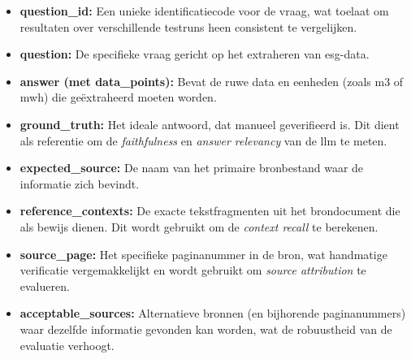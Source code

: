 \begin{itemize}
    \item \textbf{question\_id:} Een unieke identificatiecode voor de vraag, wat toelaat om resultaten over verschillende testruns heen consistent te vergelijken.
    \item \textbf{question:} De specifieke vraag gericht op het extraheren van \gls{esg}-data.
    \item \textbf{answer (met data\_points):} Bevat de ruwe data en eenheden (zoals \gls{m3} of \gls{mwh}) die geëxtraheerd moeten worden.
    \item \textbf{ground\_truth:} Het ideale antwoord, dat manueel geverifieerd is. Dit dient als referentie om de \textit{faithfulness} en \textit{answer relevancy} van de \gls{llm} te meten.
    \item \textbf{expected\_source:} De naam van het primaire bronbestand waar de informatie zich bevindt.
    \item \textbf{reference\_contexts:} De exacte tekstfragmenten uit het brondocument die als bewijs dienen. Dit wordt gebruikt om de \textit{context recall} te berekenen.
    \item \textbf{source\_page:} Het specifieke paginanummer in de bron, wat handmatige verificatie vergemakkelijkt en wordt gebruikt om \textit{source attribution} te evalueren.
    \item \textbf{acceptable\_sources:} Alternatieve bronnen (en bijhorende paginanummers) waar dezelfde informatie gevonden kan worden, wat de robuustheid van de evaluatie verhoogt.
\end{itemize}
